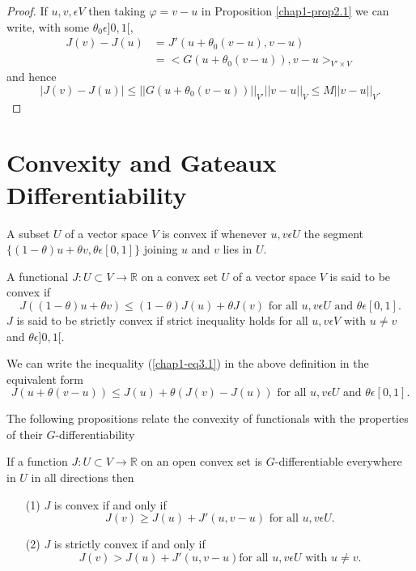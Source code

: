 \begin{proof}
If $u, v, \epsilon V$ then taking $\varphi = v - u$ in Proposition \ref{chap1-prop2.1} we can write, with some $\theta_{0} \epsilon ]0, 1[$,
\begin{align*}
J(v) - J(u) & = J'(u + \theta_{0}(v-u), v-u)\\
& = <G(u + \theta_{0} (v-u)), v-u>_{V' \times V}
\end{align*}
and hence
$$
|J(v) - J(u)| \leq ||G(u + \theta_{0} (v-u))||_{V'} ||v-u||_{V} \leq M||v-u||_{V}.
$$
\end{proof}

\section{Convexity and Gateaux Differentiability}\label{chap1-sec3}
A subset $U$ of a vector space $V$ is convex if whenever $u, v \epsilon U$ the segment $\{(1 - \theta)u + \theta v, \theta \epsilon [0, 1]\}$ joining $u$ and $v$ lies in $U$.

\begin{definition}\label{chap1-def3.1}
A functional $J : U \subset V \to \mathbb{R}$ on a convex set $U$ of a vector
space $V$ is said to be convex if
\begin{equation*}
 J((1 - \theta)u + \theta v) \leq (1 - \theta)J(u) + \theta J(v) \text{ for all } u, v \epsilon U \text{ and } \theta \epsilon [0, 1].\tag{3.1}\label{chap1-eq3.1}
\end{equation*}
$J$ is said to be strictly convex if strict inequality holds for all $u, v \epsilon V$ with $u \neq v$ and $\theta \epsilon ]0, 1[$.
\end{definition}

We can write the inequality (\ref{chap1-eq3.1}) in the above definition in the equivalent form 
\begin{equation*}
 J(u + \theta(v - u)) \leq J(u) + \theta(J(v) - J(u)) \text{ for all } u, v \epsilon U \text{ and } \theta \epsilon [0, 1].\tag*{$(3.1)'$}\label{chap1-eq3.1'}
\end{equation*}\pageoriginale

The following propositions relate the convexity of functionals with the properties of their $G$-differentiability

\begin{proposition}\label{chap1-prop3.1}
If a function $J : U \subset V \to \mathbb{R}$ on an open convex set is $G$-differentiable everywhere in $U$ in all directions then
\begin{enumerate}
\item[(1)] $J$ is convex if and only if
$$
J(v) \geq J(u) + J'(u, v-u) \text{ for all } u, v \epsilon U.
$$
\item[(2)] $J$ is strictly convex if and only if
$$
J(v) > J(u) + J'(u, v-u) \text{for all } u, v \epsilon U \text{ with } u \neq v.
$$
\end{enumerate}
\end{proposition}

